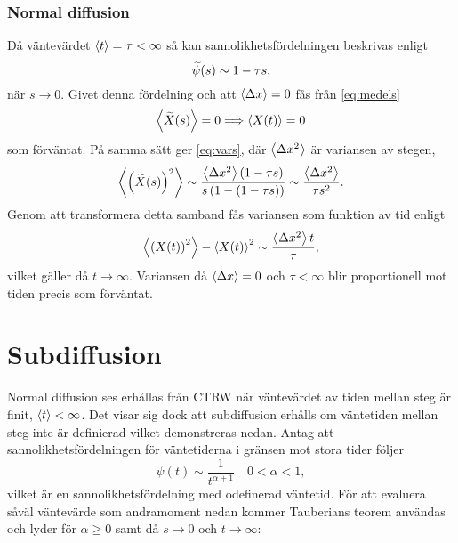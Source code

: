\subsubsection{Normal diffusion}
Då väntevärdet $\ev{t}=\tau<\infty$ så kan sannolikhetsfördelningen beskrivas enligt  
\begin{equation}
\widetilde{\psi} (s) \sim 1-\tau s,
\end{equation}
när $s\to 0$. Givet denna fördelning och att $\ev{\Delta x}=0$ fås från \eqref{eq:medels}
\begin{equation}
   \ev{\Xs} = 0 \Longrightarrow \ev{X(t)} = 0
\end{equation}
som förväntat. På samma sätt ger \eqref{eq:vars}, där $\ev{\Delta x^2}$ är variansen av stegen,
\begin{equation}
   \ev{\left(\Xs\right)^2} \sim \frac{\ev{\Delta x^2}\left(1-\tau s\right)}{s\left(1-\left(1-\tau s\right)\right)} \sim \frac{\ev{\Delta x^2}}{\tau s^2}.
\end{equation}
Genom att transformera detta samband fås variansen som funktion av tid enligt 
\begin{equation}
    \ev{\left(X(t)\right)^2}-\ev{X(t)}^2 \sim \frac{\ev{\Delta x^2}t}{\tau},
\end{equation}
vilket gäller då $t\to\infty$. Variansen då $\ev{\Delta x}=0$ och $\tau<\infty$ blir proportionell mot tiden precis som förväntat.


\section{Subdiffusion}

Normal diffusion ses erhållas från CTRW när väntevärdet av tiden mellan steg är finit, $\ev{t}<\infty$. Det visar sig dock att subdiffusion erhålls om väntetiden mellan steg inte är definierad vilket demonstreras nedan. Antag att sannolikhetsfördelningen för väntetiderna i gränsen mot stora tider följer 
\begin{equation}
\psi(t) \sim \frac{1}{t^{\alpha+1}}\quad 0<\alpha<1,
\end{equation}
vilket är en sannolikhetsfördelning med odefinerad väntetid. För att evaluera såväl väntevärde som andramoment nedan kommer Tauberians teorem\cite{Feller_prob1971} användas och lyder för $\alpha\geq0$ samt då $s\to 0$ och $t\to\infty$:


